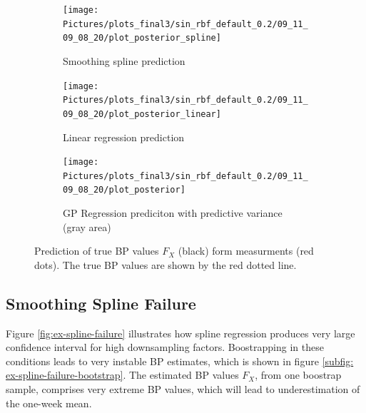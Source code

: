 \begin{figure}[!ht]
\centering
\begin{subfigure}{.45\textwidth}
    \centering
    \texttt{[image: Pictures/plots\_final3/sin\_rbf\_default\_0.2/09\_11\_09\_08\_20/plot\_posterior\_spline]}
  \caption[Spline]{Smoothing spline prediction}
  \label{fig:ex2-spline}
\end{subfigure}\hfill
\begin{subfigure}{.45\textwidth}
    \centering
    \texttt{[image: Pictures/plots\_final3/sin\_rbf\_default\_0.2/09\_11\_09\_08\_20/plot\_posterior\_linear]}
  \caption[Linear Regression]{Linear regression prediction}
  \label{fig:ex2-linear}
\end{subfigure}
\begin{subfigure}{0.6\textwidth}
    \centering
    \texttt{[image: Pictures/plots\_final3/sin\_rbf\_default\_0.2/09\_11\_09\_08\_20/plot\_posterior]}
  \caption[GP Prediction]{GP Regression prediciton with predictive variance (gray area)}
  \label{fig:ex2-gp}
\end{subfigure}
\caption[True BP value prediction]{Prediction of true BP values $F_X$ (black) form measurments (red dots). The true BP values are shown
by the red dotted line. }
\label{fig:ex2}
\end{figure}



\subsection{Smoothing Spline Failure}
Figure \ref{fig:ex-spline-failure} illustrates how spline regression
produces  very
large confidence interval for high downsampling factors.
Boostrapping in these conditions leads to very instable BP estimates,
which is shown in figure \ref{subfig: ex-spline-failure-bootstrap}.
The estimated BP values $F_X$, from one boostrap sample, comprises very extreme BP values, which will
lead to underestimation of the one-week mean.

